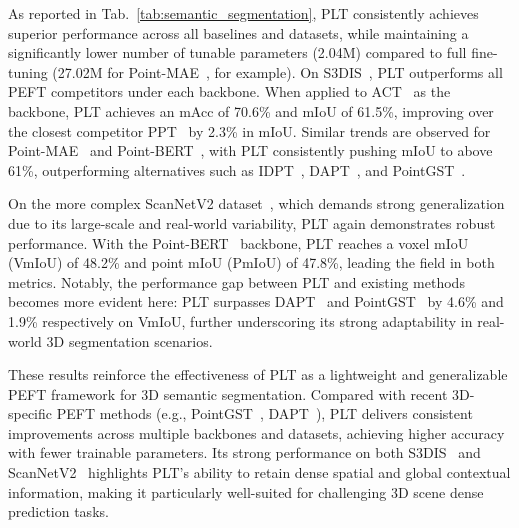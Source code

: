 As reported in Tab.~\ref{tab:semantic_segmentation}, PLT consistently achieves superior performance across all baselines and datasets, while maintaining a significantly lower number of tunable parameters (2.04M) compared to full fine-tuning (27.02M for Point-MAE~\cite{pang2022masked}, for example). On S3DIS~\cite{armeni20163d}, PLT outperforms all PEFT competitors under each backbone. When applied to ACT~\cite{dong2022autoencoders} as the backbone, PLT achieves an mAcc of 70.6\% and mIoU of 61.5\%, improving over the closest competitor PPT~\cite{zhang2024positional} by 2.3\% in mIoU. Similar trends are observed for Point-MAE~\cite{pang2022masked} and Point-BERT~\cite{yu2022point}, with PLT consistently pushing mIoU to above 61\%, outperforming alternatives such as IDPT~\cite{zha2023instance}, DAPT~\cite{zhou2024dynamic}, and PointGST~\cite{liang2024parameter}. 

On the more complex ScanNetV2 dataset~\cite{dai2017scannet}, which demands strong generalization due to its large-scale and real-world variability, PLT again demonstrates robust performance. With the Point-BERT~\cite{yu2022point} backbone, PLT reaches a voxel mIoU (VmIoU) of 48.2\% and point mIoU (PmIoU) of 47.8\%, leading the field in both metrics. Notably, the performance gap between PLT and existing methods becomes more evident here: PLT surpasses DAPT~\cite{zhou2024dynamic} and PointGST~\cite{liang2024parameter} by 4.6\% and 1.9\% respectively on VmIoU, further underscoring its strong adaptability in real-world 3D segmentation scenarios. 

These results reinforce the effectiveness of PLT as a lightweight and generalizable PEFT framework for 3D semantic segmentation. Compared with recent 3D-specific PEFT methods (e.g., PointGST~\cite{liang2024parameter}, DAPT~\cite{zhou2024dynamic}), PLT delivers consistent improvements across multiple backbones and datasets, achieving higher accuracy with fewer trainable parameters. Its strong performance on both S3DIS~\cite{armeni20163d} and ScanNetV2~\cite{dai2017scannet} highlights PLT’s ability to retain dense spatial and global contextual information, making it particularly well-suited for challenging 3D scene dense prediction tasks.

